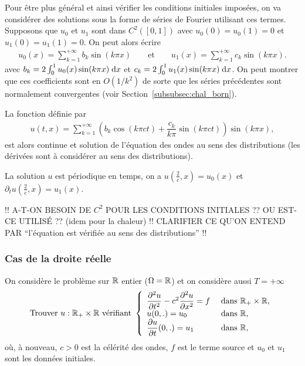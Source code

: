 \documentclass[12pt,a4paper,twoside]{article}
\begin{document}
Pour \^etre plus g\'en\'eral et ainsi v\'erifier les conditions initiales impos\'ees,
on va consid\'erer des solutions 
sous la forme de s\'eries de Fourier utilisant ces termes.
Supposons que $u_0$ et $u_1$ sont dans $C^{2}([0,1])$
avec $u_0(0) = u_0(1) = 0$
et $u_1(0) = u_1(1) = 0$.
On peut alors \'ecrire
\begin{align*}
  u_0(x) = \sum\limits_{k=1}^{+\infty} b_k \sin (k \pi x)
  \qquad \text{et} \qquad
  u_1(x) = \sum\limits_{k=1}^{+\infty} c_k \sin (k \pi x) .
\end{align*}
avec $b_k = 2 \int_0^1 u_0(x) \sin(k \pi x) \;\mathrm{d} x$
et $c_k = 2 \int_0^1 u_1(x) \sin(k \pi x) \;\mathrm{d} x$.
On peut montrer que ces coefficients sont en $O(1/k^2)$ de sorte que les s\'eries
pr\'ec\'edentes sont normalement convergentes (voir Section~\ref{subsubsec:chal_born}).

La fonction d\'efinie par
\begin{align*}
  u(t,x) = \sum\limits_{k=1}^{+\infty} ( b_k \cos(k \pi c t) + \dfrac{c_k}{k \pi} \sin(k \pi c t) ) 
  \sin(k \pi x) ,
\end{align*}
est alors continue et solution de l'\'equation des ondes au sens des distributions
(les d\'eriv\'ees sont \`a consid\'erer au sens des distributions).


\begin{remark}
  La solution $u$ est p\'eriodique en temps, on a $u(\frac{2}{c}, x) = u_0(x)$
  et $\partial_t u(\frac{2}{c}, x) = u_1(x)$.
\end{remark}


!! A-T-ON BESOIN DE $C^2$ POUR LES CONDITIONS INITIALES ??
OU EST-CE UTILIS\'E ?? (idem pour la chaleur)
!! CLARIFIER CE QU'ON ENTEND PAR ``l'\'equation est v\'erifi\'ee au sens des distributions'' !!

\subsubsection{Cas de la droite r\'eelle}

On consid\`ere le probl\`eme sur $\mathbb{R}$ entier ($\Omega = \mathbb{R}$) et on consid\`ere aussi $T = + \infty$
\begin{equation}
  \label{eq:ondes_R}
  \text{Trouver $u : \mathbb{R}_+ \times \mathbb{R}$ v\'erifiant  }
  \left\{
    \begin{array}{l l}
      \dfrac{\partial^2 u}{\partial t^2} - c^2 \dfrac{\partial^2 u}{\partial x^2} = f 
      &\text{ dans } \mathbb{R}_+ \times \mathbb{R} ,
      \\
      u(0,.) = u_0 
      & \text{ dans } \mathbb{R} ,
      \\
      \dfrac{\partial u}{\partial t}(0,.) = u_1 
      & \text{ dans } \mathbb{R} ,
    \end{array}
  \right.
\end{equation}
o\`u, \`a nouveau, $c > 0$ est la c\'el\'erit\'e des ondes, $f$ est le terme source
et $u_0$ et $u_1$ sont les donn\'ees initiales.
\end{document}

